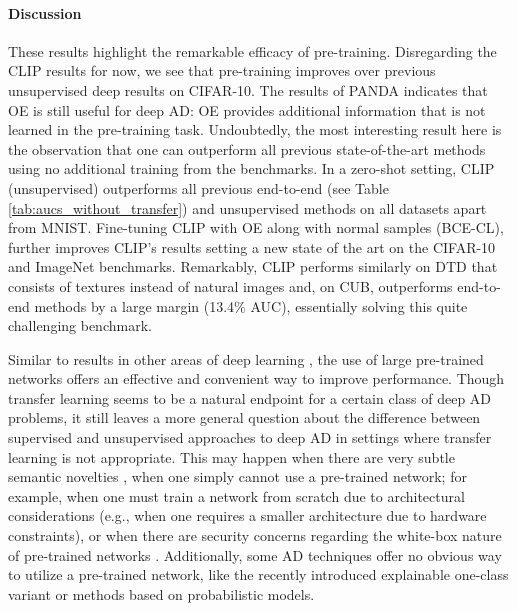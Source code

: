 \documentclass[10pt]{article} \usepackage[accepted]{stylefiles/tmlr}
\begin{document}
\paragraph{Discussion}
These results highlight the remarkable efficacy of pre-training. 
Disregarding the CLIP results for now, we see that pre-training improves over previous unsupervised deep results on CIFAR-10. 
The results of PANDA indicates that OE is still useful for deep AD: OE provides additional information that is not learned in the pre-training task. 
Undoubtedly, the most interesting result here is the observation that one can outperform all previous state-of-the-art methods using no additional training from the benchmarks.
In a zero-shot setting, CLIP (unsupervised) outperforms all previous end-to-end (see Table \ref{tab:aucs_without_transfer}) and unsupervised methods on all datasets apart from MNIST. 
Fine-tuning CLIP with OE along with normal samples (BCE-CL), further improves CLIP's results setting a new state of the art on the CIFAR-10 and ImageNet benchmarks.
Remarkably, CLIP performs similarly on DTD that consists of textures instead of natural images and, on CUB, outperforms end-to-end methods by a large margin (13.4\% AUC), essentially solving this quite challenging benchmark.

Similar to results in other areas of deep learning \citep{bommasani2021opportunities}, the use of large pre-trained networks offers an effective and convenient way to improve performance.
Though transfer learning seems to be a natural endpoint for a certain class of deep AD problems, it still leaves a more general question about the difference between supervised and unsupervised approaches to deep AD in settings where transfer learning is not appropriate. 
This may happen when there are very subtle semantic novelties \citep{vaze2022openset}, when one simply cannot use a pre-trained network; for example, when one must train a network from scratch due to architectural considerations (e.g., when one requires a smaller architecture due to hardware constraints), or when there are security concerns regarding the white-box nature of pre-trained networks \citep{samek2021explaining}.
Additionally, some AD techniques offer no obvious way to utilize a pre-trained network, like the recently introduced explainable one-class variant \citep{liznerski2021} or methods based on probabilistic models. 
\end{document}
